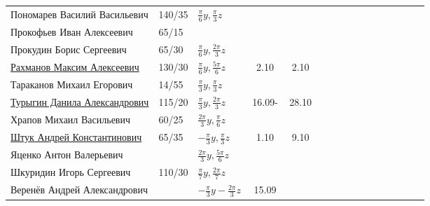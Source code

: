 \documentclass[a4paper,11pt]{article}
\begin{document}
\begin{tabular}{l|llccccccccccccc}
Пономарев Василий Васильевич	&140/35&$\frac{\pi}{6}y,\frac{\pi}{3}z$&       &\\
Прокофьев Иван Алексеевич	&65/15 &&       &\\	
Прокудин Борис Сергеевич	&65/30 &$\frac{\pi}{6}y,\frac{2\pi}{3}z$&       &\\	
\href{}{Рахманов Максим Алексеевич}	        &130/30&$\frac{\pi}{6}y,\frac{5\pi}{6}z$&2.10&2.10&\\	
Тараканов Михаил Егорович	&14/55&$\frac{\pi}{3}y,\frac{\pi}{3}z$&       &\\	
\href{}{Турыгин Данила Александрович}	        &115/20&$\frac{\pi}{3}y,\frac{2\pi}{3}z$&\,16.09-\,&28.10\\
Храпов Михаил Васильевич	&60/25 &$\frac{2\pi}{3}y,\frac{\pi}{6}z$&       &\\	
\midrule                                    
\href{}{Штук Андрей Константинович}	                &65/35 &$-\frac{\pi}{3}y,\frac{\pi}{3}z$&1.10&9.10\\	
Яценко Антон Валерьевич		&  &$\frac{2\pi}{3}y,\frac{5\pi}{6}z$&       &\\
Шкуридин Игорь Сергеевич	&110/30&$\frac{\pi}{7}y,\frac{2\pi}{7}z$&       &\\	
Веренёв Андрей Александрович	&  &$-\!\frac{\pi}{3}y\!-\!\frac{2\pi}{3}z\!$&\,15.09\,&\\
\bottomrule
\end{tabular}
\end{document}
